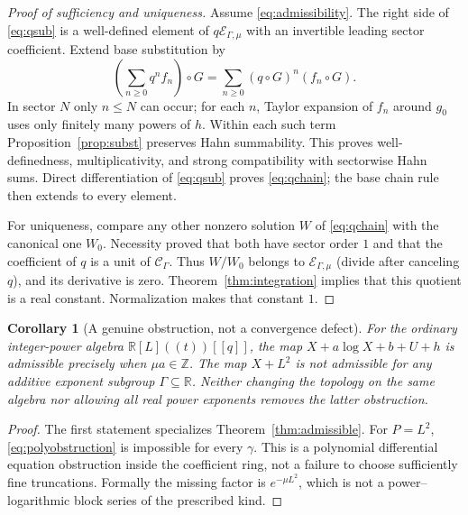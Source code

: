 \documentclass[11pt,a4paper]{article}
\newtheorem{corollary}[theorem]{Corollary}
\theoremstyle{definition}
\theoremstyle{remark}
\newcommand{\R}{\mathbb R}
\newcommand{\Z}{\mathbb Z}
\newcommand{\C}{\mathcal C_\Gamma}
\newcommand{\E}{\mathcal E_{\Gamma,\mu}}
\begin{document}
\begin{proof}[Proof of sufficiency and uniqueness]
Assume \eqref{eq:admissibility}. The right side of \eqref{eq:qsub} is a
well-defined element of $q\E$ with an invertible leading sector
coefficient. Extend base substitution by
\begin{equation}\label{eq:fullsub}
 \left(\sum_{n\ge0}q^nf_n\right)\circ G
   =\sum_{n\ge0}(q\circ G)^n(f_n\circ G).
\end{equation}
In sector $N$ only $n\le N$ can occur; for each $n$, Taylor expansion of
$f_n$ around $g_0$ uses only finitely many powers of $h$. Within each such
term Proposition~\ref{prop:subst} preserves Hahn summability. This proves
well-definedness, multiplicativity, and strong compatibility with sectorwise
Hahn sums. Direct differentiation of \eqref{eq:qsub} proves
\eqref{eq:qchain}; the base chain rule then extends to every element.

For uniqueness, compare any other nonzero solution $W$ of
\eqref{eq:qchain} with the canonical one $W_0$. Necessity proved that both
have sector order $1$ and that the coefficient of $q$ is a unit of $\C$.
Thus $W/W_0$ belongs to $\E$ (divide after canceling $q$), and its derivative
is zero. Theorem~\ref{thm:integration} implies that this quotient is a real
constant. Normalization makes that constant $1$.
\end{proof}

\begin{corollary}[A genuine obstruction, not a convergence defect]
For the ordinary integer-power algebra $\R[L]((t))[[q]]$, the map
$X+a\log X+b+U+h$ is admissible precisely when $\mu a\in\Z$.
The map $X+L^2$ is not admissible for any additive exponent subgroup
$\Gamma\subseteq\R$. Neither changing the topology on the same algebra nor
allowing all real power exponents removes the latter obstruction.
\end{corollary}
\begin{proof}
The first statement specializes Theorem~\ref{thm:admissible}. For $P=L^2$,
\eqref{eq:polyobstruction} is impossible for every $\gamma$. This is a
polynomial differential equation obstruction inside the coefficient ring,
not a failure to choose sufficiently fine truncations. Formally the missing
factor is $e^{-\mu L^2}$, which is not a power--logarithmic block series of
the prescribed kind.
\end{proof}
\end{document}
